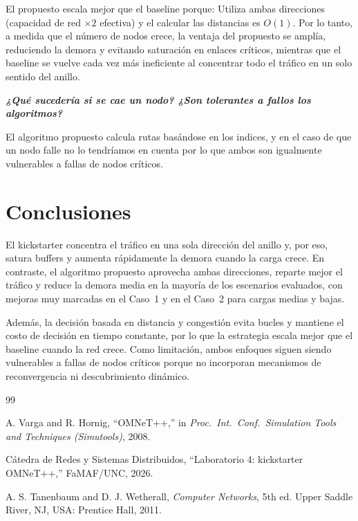 \documentclass[10pt,letterpaper,twocolumn]{article}
\begin{document}
El propuesto escala mejor que el baseline porque: Utiliza ambas direcciones (capacidad de red $\times 2$ efectiva) y el calcular las distancias es $O(1)$. Por lo tanto, a medida que el número de nodos crece, la ventaja del propuesto se amplía, reduciendo la demora y evitando saturación en enlaces críticos, mientras que el baseline se vuelve cada vez más ineficiente al concentrar todo el tráfico en un solo sentido del anillo.

\textbf{\textit{¿Qué sucedería si se cae un nodo? ¿Son tolerantes a fallos los algoritmos?}}

El algoritmo propuesto calcula rutas basándose en los indices, y en el caso de que un nodo falle no lo tendríamos en cuenta por lo que ambos son igualmente vulnerables a fallas de nodos críticos.

\FloatBarrier

\section{Conclusiones}
\label{sec:conclusiones}

El kickstarter concentra el tráfico en una sola dirección del anillo y, por eso, satura buffers y aumenta rápidamente la demora cuando la carga crece. En contraste, el algoritmo propuesto aprovecha ambas direcciones, reparte mejor el tráfico y reduce la demora media en la mayoría de los escenarios evaluados, con mejoras muy marcadas en el Caso~1 y en el Caso~2 para cargas medias y bajas.

Además, la decisión basada en distancia y congestión evita bucles y mantiene el costo de decisión en tiempo constante, por lo que la estrategia escala mejor que el baseline cuando la red crece. Como limitación, ambos enfoques siguen siendo vulnerables a fallas de nodos críticos porque no incorporan mecanismos de reconvergencia ni descubrimiento dinámico.

\begin{thebibliography}{99}

A. Varga and R. Hornig, ``OMNeT++,'' in \emph{Proc.\ Int.\ Conf.\ Simulation Tools and Techniques (Simutools)}, 2008.

Cátedra de Redes y Sistemas Distribuidos, ``Laboratorio 4: kickstarter OMNeT++,'' FaMAF/UNC, 2026.

A. S. Tanenbaum and D. J. Wetherall, \emph{Computer Networks}, 5th ed. Upper Saddle River, NJ, USA: Prentice Hall, 2011.

\end{thebibliography}
\end{document}
